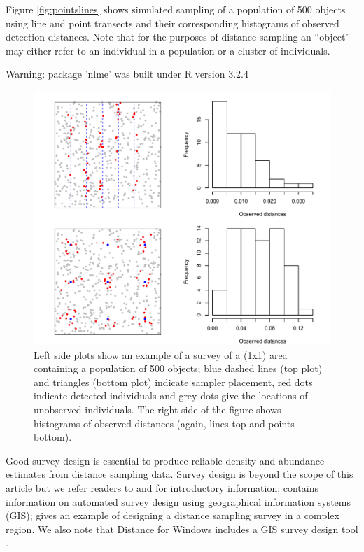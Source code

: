\documentclass[article,shortnames]{jss}
\begin{document}
Figure \ref{fig:pointslines} shows simulated sampling of a population of
500 objects using line and point transects and their corresponding
histograms of observed detection distances. Note that for the purposes
of distance sampling an ``object'' may either refer to an individual in
a population or a cluster of individuals.

\begin{CodeChunk}
\begin{CodeOutput}
Warning: package 'nlme' was built under R version 3.2.4
\end{CodeOutput}
\begin{figure}

{\centering \includegraphics{paper_files/figure-latex/points-and-lines-1} 

}

\caption{Left side plots show an example of a survey of a (1x1) area containing a population of 500 objects; blue dashed lines (top plot) and triangles (bottom plot) indicate sampler placement, red dots indicate detected individuals and grey dots give the locations of unobserved individuals. The right side of the figure shows histograms of observed distances (again, lines top and points bottom).\label{fig:pointslines}}\label{fig:points-and-lines}
\end{figure}
\end{CodeChunk}

Good survey design is essential to produce reliable density and
abundance estimates from distance sampling data. Survey design is beyond
the scope of this article but we refer readers to \citet[Chapter
7]{Buckland:2001vm} and \citet[Chapter 2]{buckland2015distance} for
introductory information; \citet{Strindberg:2004vr} contains information
on automated survey design using geographical information systems (GIS);
\citet{Thomas:2007wz} gives an example of designing a distance sampling
survey in a complex region. We also note that Distance for Windows
includes a GIS survey design tool \citep{Thomas:2010cf}.
\end{document}
